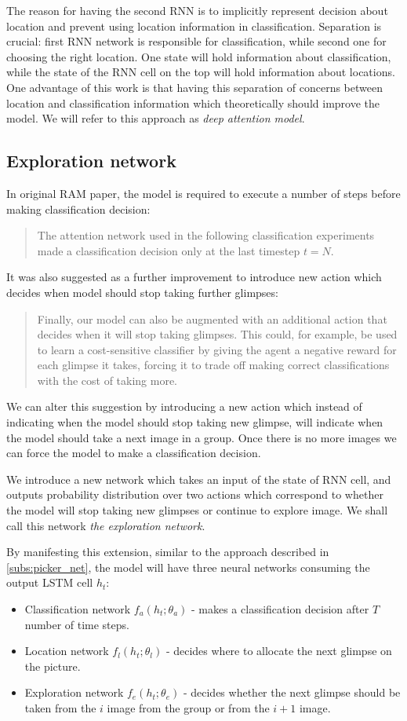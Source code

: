 The reason for having the second \gls{RNN} is to implicitly
represent decision about location and
prevent using location information in classification. Separation is crucial:
first \gls{RNN} network is responsible for
classification, while second one for choosing the right location.
One state will hold information about classification, while the state of
the \gls{RNN} cell on the top will hold information about locations.
One advantage of this work is that having this separation of concerns between
location and classification information which theoretically should improve the model.
We will refer to this approach as \emph{deep attention model}.

\subsection{Exploration network}
In original RAM paper, the model is required to execute a number of
steps before making classification decision:
\blockquote{
The attention network used in the following classification experiments made
a classification decision only at the last timestep $t = N$.
}\cite{DBLP:journals/corr/MnihHGK14}
It was also suggested as a further improvement to introduce new action
which decides when model should stop taking further glimpses:
\blockquote{
Finally, our model can also be augmented with an additional action that decides
when it will stop taking glimpses. This could, for example, be used to learn a
cost-sensitive classifier by giving the agent a negative reward for each glimpse
it takes, forcing it to trade off making correct classifications with the cost of
taking more. \cite{DBLP:journals/corr/MnihHGK14}
}

We can alter this suggestion by introducing a new action which
instead of indicating when the model should stop taking new glimpse, will
indicate when the model should take a next image in a group. Once there is no more images
we can force the model to make a classification decision.

We introduce a new network which takes an input of the state of RNN cell, and outputs
probability distribution over two actions which correspond to whether the model
will stop taking new glimpses
or continue to explore image.
We shall call this network \emph{the exploration network}.

By manifesting
this extension, similar to the approach described in \autoref{subs:picker_net},
the model will have three neural networks consuming
the output LSTM cell $h_t$:
\begin{itemize}
	\item Classification network $f_a(h_t; \theta_a)$ - makes a classification
		decision after $T$ number of time steps.
	\item Location network $f_l(h_t; \theta_l)$ - decides where to allocate the next glimpse
	on the picture.
	\item Exploration network $f_e(h_t; \theta_e)$ - decides whether the next glimpse
	should be taken
	from the $i$ image from the group or from the $i+1$ image.
\end{itemize}

